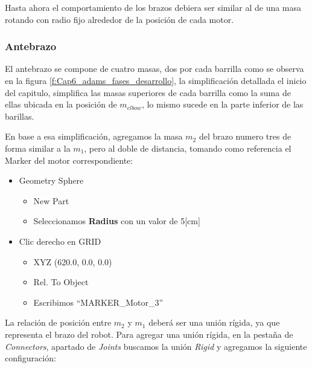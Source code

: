         Hasta ahora el comportamiento de los brazos debiera ser similar al de una masa rotando con radio fijo alrededor de la posición de cada motor.
        
        \subsubsection{Antebrazo}
        
        El antebrazo se compone de cuatro masas, dos por cada barrilla como se observa en la figura
        \eqref{f:Cap6_adams_fases_desarrollo}, la simplificación detallada el inicio del capitulo, simplifica las masas superiores de cada barrilla como la suma de ellas ubicada en la posición de $m_{elbow}$, lo mismo sucede en la parte inferior de las barillas.
        
        En base a esa simplificación, agregamos la masa $m_{2}$ del brazo numero tres de forma similar a la $m_{1}$, pero al doble de distancia, tomando como referencia el Marker del motor correspondiente: 
        
        \begin{scope}
            \renewcommand{\labelitemi}{\blacklozenge}
            \renewcommand{\labelitemii}{\checkmark}
            \begin{itemize}
                \item Geometry Sphere
                \begin{itemize}
                    \item New Part
                    \item Seleccionamos \textbf{Radius} con un valor de 5[cm]
                \end{itemize}
                \item Clic derecho en GRID
                \begin{itemize}
                    \item XYZ (620.0, 0.0, 0.0)
                    \item Rel. To Object
                    \item Escribimos ``MARKER\_Motor\_3''
                \end{itemize}
            \end{itemize}
        \end{scope}
        

        
        La relación de posición entre $m_{2}$ y $m_{1}$ deberá ser una unión rígida, ya que representa el brazo del robot. Para agregar una unión rígida, en la pestaña de \textit{Connectors}, apartado de \textit{Joints} buscamos la unión \textit{Rigid} y agregamos la siguiente configuración:
        
